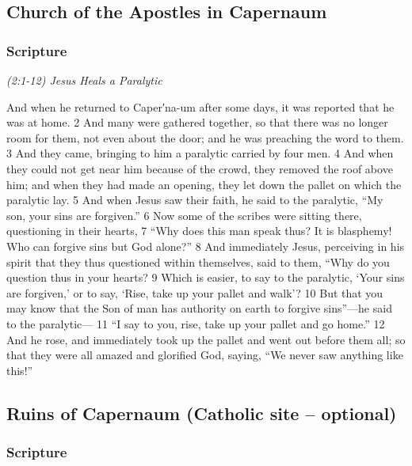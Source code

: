 \documentclass[letterpaper]{report}
\begin{document}
\clearpage
\subsection{Church of the Apostles in Capernaum}
\begin{multicols}{2}
	\mbox{}
\end{multicols}
\subsubsection{Scripture}

{\centering
	\emph{(2:1-12) Jesus Heals a Paralytic}\\
}
\begin{multicols}{2}
And when he returned to Caper′na-um after some days, it was reported that he was at home. 2 And many were gathered together, so that there was no longer room for them, not even about the door; and he was preaching the word to them. 3 And they came, bringing to him a paralytic carried by four men. 4 And when they could not get near him because of the crowd, they removed the roof above him; and when they had made an opening, they let down the pallet on which the paralytic lay. 5 And when Jesus saw their faith, he said to the paralytic, “My son, your sins are forgiven.” 6 Now some of the scribes were sitting there, questioning in their hearts, 7 “Why does this man speak thus? It is blasphemy! Who can forgive sins but God alone?” 8 And immediately Jesus, perceiving in his spirit that they thus questioned within themselves, said to them, “Why do you question thus in your hearts? 9 Which is easier, to say to the paralytic, ‘Your sins are forgiven,’ or to say, ‘Rise, take up your pallet and walk’? 10 But that you may know that the Son of man has authority on earth to forgive sins”—he said to the paralytic— 11 “I say to you, rise, take up your pallet and go home.” 12 And he rose, and immediately took up the pallet and went out before them all; so that they were all amazed and glorified God, saying, “We never saw anything like this!”
\end{multicols}

\clearpage
\subsection{Ruins of Capernaum (Catholic site – optional)}
\begin{multicols}{2}
	\mbox{}
\end{multicols}
\subsubsection{Scripture}
\end{document}
